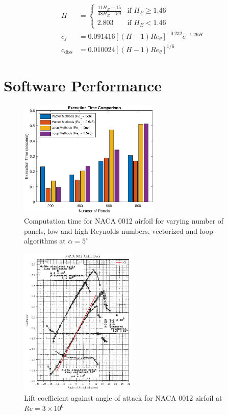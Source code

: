 \documentclass{article}
\begin{document}
\begin{align}
    H &= \begin{cases}
        \frac{11 H_E + 15}{48H_E - 59} & \text{if } H_E  \ge 1.46 \\
        2.803 & \text{if } H_E < 1.46
    \end{cases} \\
    c_f &= 0.091416\left[(H-1)Re_\theta \right]^{-0.232}e^{-1.26H} \\
    c_\text{diss} &= 0.010024\left[(H-1)Re_\theta \right]^{1/6}
\end{align}

\section{Software Performance}

\begin{figure}[H]
    \centering
    \includegraphics[width=0.6\textwidth]{figures/RePanelVec_times.eps}
    \caption{Computation time for NACA 0012 airfoil for varying number of panels, low and high Reynolds numbers, vectorized and loop algorithms at $\alpha = 5^\circ$}
    \label{fig:airfoil}
\end{figure}


\begin{figure}[H]
    \centering
    \includegraphics[width=0.5\textwidth]{figures/NACA0012_lift_validation.png}
    \caption{Lift coefficient against angle of attack for NACA 0012 airfoil at $Re = 3\times10^6$}
    \label{fig:0012_lift_validation}
\end{figure}
\end{document}
